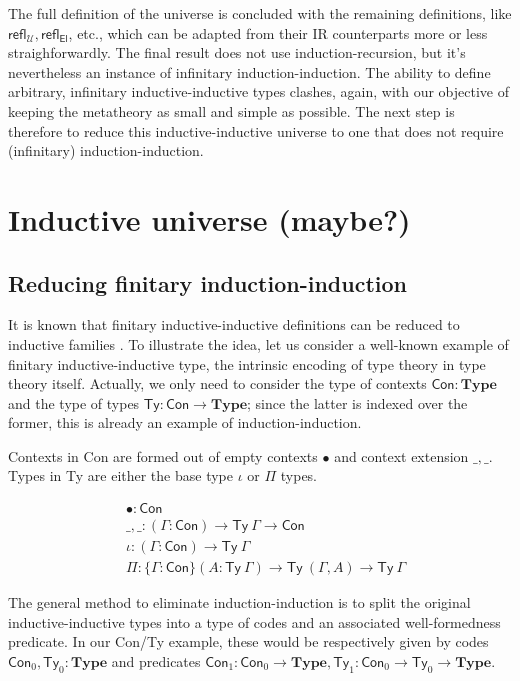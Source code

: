 \documentclass{easychair}
\newcommand{\GG}{\Gamma}
\newcommand{\setoidU}{\mathcal{U}}
\newcommand{\mType}{\mathbf{Type}}
\newcommand{\El}{\textsf{El}}
\newcommand{\reflu}{\textsf{refl}_\setoidU}
\newcommand{\reflel}{\textsf{refl}_\El}
\begin{document}
The full definition of the universe is concluded with the remaining definitions,
like $\reflu, \reflel$, etc., which can be adapted from their IR counterparts
more or less straighforwardly. The final result does not use
induction-recursion, but it's nevertheless an instance of infinitary
induction-induction. The ability to define arbitrary, infinitary
inductive-inductive types clashes, again, with our objective of keeping the
metatheory as small and simple as possible. The next step is therefore to reduce
this inductive-inductive universe to one that does not require (infinitary)
induction-induction.

\section{Inductive universe (maybe?)}

\subsection{Reducing finitary induction-induction}

It is known that finitary inductive-inductive definitions can be reduced to
inductive families \cite{iit-erasure,iit-to-ix,induction-is-enough}.
%
To illustrate the idea, let us consider a well-known example of finitary
inductive-inductive type, the intrinsic encoding of type theory in type theory
itself. Actually, we only need to consider the type of contexts $\textsf{Con} :
\mType$ and the type of types $\textsf{Ty} : \textsf{Con} \to \mType$; since the
latter is indexed over the former, this is already an example of
induction-induction.

Contexts in \textsf{Con} are formed out of empty contexts $\bullet$ and context
extension $\_,\_$. Types in \textsf{Ty} are either the base type $\iota$ or
$\Pi$ types.

\begin{align*}
  & \bullet : \textsf{Con} \\
  & \_,\_ : (\GG : \textsf{Con}) \to \textsf{Ty}\ \GG \to \textsf{Con} \\
  & \iota : (\GG : \textsf{Con}) \to \textsf{Ty}\ \GG \\
  & \Pi : \{\GG : \textsf{Con}\} (A : \textsf{Ty}\ \GG) \to \textsf{Ty}\ (\GG , A) \to \textsf{Ty}\ \GG
\end{align*}

The general method to eliminate induction-induction is to split the original
inductive-inductive types into a type of codes and an associated well-formedness
predicate. In our \textsf{Con/Ty} example, these would be respectively given by
codes $\textsf{Con}_0, \textsf{Ty}_0 : \mType$ and predicates $\textsf{Con}_1 :
\textsf{Con}_0 \to \mType, \textsf{Ty}_1 : \textsf{Con}_0 \to \textsf{Ty}_0 \to
\mType$.
\end{document}
